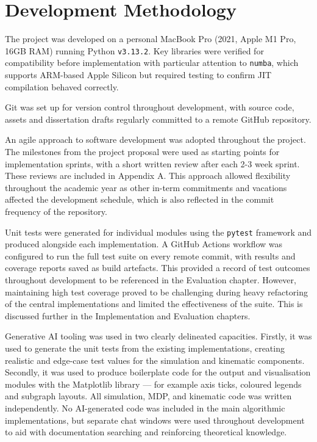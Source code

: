 \section{Development Methodology}
\label{sec:2.5}
The project was developed on a personal MacBook Pro (2021, Apple M1 Pro, 16GB RAM) running Python \texttt{v3.13.2}. Key libraries were verified for compatibility before implementation with particular attention to \texttt{numba}, which supports ARM-based Apple Silicon\cite{numba_install} but required testing to confirm JIT compilation behaved correctly.

Git was set up for version control throughout development, with source code, assets and dissertation drafts regularly committed to a remote GitHub repository.

An agile approach to software development was adopted throughout the project. The milestones from the project proposal were used as starting points for implementation sprints, with a short written review after each 2-3 week sprint. These reviews are included in Appendix A. This approach allowed flexibility throughout the academic year as other in-term commitments and vacations affected the development schedule, which is also reflected in the commit frequency of the repository.

Unit tests were generated for individual modules using the \texttt{pytest} framework and produced alongside each implementation. A GitHub Actions workflow was configured to run the full test suite on every remote commit, with results and coverage reports saved as build artefacts. This provided a record of test outcomes throughout development to be referenced in the Evaluation chapter. However, maintaining high test coverage proved to be challenging during heavy refactoring of the central implementations and limited the effectiveness of the suite. This is discussed further in the Implementation and Evaluation chapters.

Generative AI tooling was used in two clearly delineated capacities. Firstly, it was used to generate the unit tests from the existing implementations, creating realistic and edge-case test values for the simulation and kinematic components. Secondly, it was used to produce boilerplate code for the output and visualisation modules with the Matplotlib library --- for example axis ticks, coloured legends and subgraph layouts. All simulation, MDP, and kinematic code was written independently. No AI-generated code was included in the main algorithmic implementations, but separate chat windows were used throughout development to aid with documentation searching and reinforcing theoretical knowledge.
